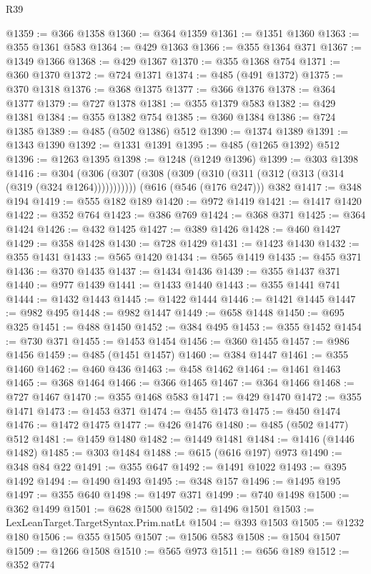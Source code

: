 \begin{lexlean}{R39}
\begin{coremodule}
@1359 := @366 @1358
@1360 := @364 @1359
@1361 := @1351 @1360
@1363 := @355 @1361 @583
@1364 := @429 @1363
@1366 := @355 @1364 @371
@1367 := @1349 @1366
@1368 := @429 @1367
@1370 := @355 @1368 @754
@1371 := @360 @1370
@1372 := @724 @1371
@1374 := @485 (@491 @1372)
@1375 := @370 @1318
@1376 := @368 @1375
@1377 := @366 @1376
@1378 := @364 @1377
@1379 := @727 @1378
@1381 := @355 @1379 @583
@1382 := @429 @1381
@1384 := @355 @1382 @754
@1385 := @360 @1384
@1386 := @724 @1385
@1389 := @485 (@502 @1386) @512
@1390 := @1374 @1389
@1391 := @1343 @1390
@1392 := @1331 @1391
@1395 := @485 (@1265 @1392) @512
@1396 := @1263 @1395
@1398 := @1248 (@1249 @1396)
@1399 := @303 @1398
@1416 := @304
    (@306 (@307 (@308 (@309 (@310 (@311 (@312 (@313 (@314 (@319 (@324 @1264)))))))))))
    (@616 (@546 (@176 @247)))
    @382
@1417 := @348 @194
@1419 := @555 @182 @189
@1420 := @972 @1419
@1421 := @1417 @1420
@1422 := @352 @764
@1423 := @386 @769
@1424 := @368 @371
@1425 := @364 @1424
@1426 := @432 @1425
@1427 := @389 @1426
@1428 := @460 @1427
@1429 := @358 @1428
@1430 := @728 @1429
@1431 := @1423 @1430
@1432 := @355 @1431
@1433 := @565 @1420
@1434 := @565 @1419
@1435 := @455 @371
@1436 := @370 @1435
@1437 := @1434 @1436
@1439 := @355 @1437 @371
@1440 := @977 @1439
@1441 := @1433 @1440
@1443 := @355 @1441 @741
@1444 := @1432 @1443
@1445 := @1422 @1444
@1446 := @1421 @1445
@1447 := @982 @495
@1448 := @982 @1447
@1449 := @658 @1448
@1450 := @695 @325
@1451 := @488 @1450
@1452 := @384 @495
@1453 := @355 @1452
@1454 := @730 @371
@1455 := @1453 @1454
@1456 := @360 @1455
@1457 := @986 @1456
@1459 := @485 (@1451 @1457)
@1460 := @384 @1447
@1461 := @355 @1460
@1462 := @460 @436
@1463 := @458 @1462
@1464 := @1461 @1463
@1465 := @368 @1464
@1466 := @366 @1465
@1467 := @364 @1466
@1468 := @727 @1467
@1470 := @355 @1468 @583
@1471 := @429 @1470
@1472 := @355 @1471
@1473 := @1453 @371
@1474 := @455 @1473
@1475 := @450 @1474
@1476 := @1472 @1475
@1477 := @426 @1476
@1480 := @485 (@502 @1477) @512
@1481 := @1459 @1480
@1482 := @1449 @1481
@1484 := @1416 (@1446 @1482)
@1485 := @303 @1484
@1488 := @615 (@616 @197) @973
@1490 := @348 @84 @22
@1491 := @355 @647
@1492 := @1491 @1022
@1493 := @395 @1492
@1494 := @1490 @1493
@1495 := @348 @157
@1496 := @1495 @195
@1497 := @355 @640
@1498 := @1497 @371
@1499 := @740 @1498
@1500 := @362 @1499
@1501 := @628 @1500
@1502 := @1496 @1501
@1503 := LexLeanTarget.TargetSyntax.Prim.natLt
@1504 := @393 @1503
@1505 := @1232 @180
@1506 := @355 @1505
@1507 := @1506 @583
@1508 := @1504 @1507
@1509 := @1266 @1508
@1510 := @565 @973
@1511 := @656 @189
@1512 := @352 @774

\end{coremodule}
\end{lexlean}

